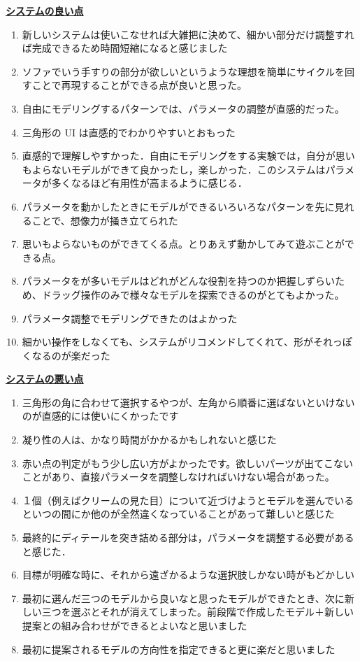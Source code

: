 \textbf{\underline{システムの良い点}}
\begin{enumerate}\label{en:systemGood}
    \item 新しいシステムは使いこなせれば大雑把に決めて、細かい部分だけ調整すれば完成できるため時間短縮になると感じました
    \item ソファでいう手すりの部分が欲しいというような理想を簡単にサイクルを回すことで再現することができる点が良いと思った。
    \item 自由にモデリングするパターンでは、パラメータの調整が直感的だった。
    \item 三角形の UI は直感的でわかりやすいとおもった
    \item 直感的で理解しやすかった．自由にモデリングをする実験では，自分が思いもよらないモデルができて良かったし，楽しかった．このシステムはパラメータが多くなるほど有用性が高まるように感じる．
    \item パラメータを動かしたときにモデルができるいろいろなパターンを先に見れることで、想像力が掻き立てられた
    \item 思いもよらないものができてくる点。とりあえず動かしてみて遊ぶことができる点。
    \item パラメータをが多いモデルはどれがどんな役割を持つのか把握しずらいため、ドラッグ操作のみで様々なモデルを探索できるのがとてもよかった。
    \item パラメータ調整でモデリングできたのはよかった
    \item 細かい操作をしなくても、システムがリコメンドしてくれて、形がそれっぽくなるのが楽だった
\end{enumerate}





\textbf{\underline{システムの悪い点}}
\begin{enumerate}
    \item 三角形の角に合わせて選択するやつが、左角から順番に選ばないといけないのが直感的には使いにくかったです
    \item 凝り性の人は、かなり時間がかかるかもしれないと感じた
    \item 赤い点の判定がもう少し広い方がよかったです。欲しいパーツが出てこないことがあり、直接パラメータを調整しなければいけない場合があった。
    \item １個（例えばクリームの見た目）について近づけようとモデルを選んでいるといつの間にか他のが全然違くなっていることがあって難しいと感じた
    \item 最終的にディテールを突き詰める部分は，パラメータを調整する必要があると感じた．
    \item 目標が明確な時に、それから遠ざかるような選択肢しかない時がもどかしい
    \item 最初に選んだ三つのモデルから良いなと思ったモデルができたとき、次に新しい三つを選ぶとそれが消えてしまった。前段階で作成したモデル＋新しい提案との組み合わせができるとよいなと思いました
    \item 最初に提案されるモデルの方向性を指定できると更に楽だと思いました
\end{enumerate}





